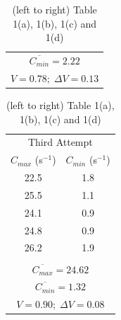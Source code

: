 \documentclass[10pt,a4paper]{article}
\begin{document}
\begin{table}[H]
\begin{tabular}{|c|c|}
\multicolumn{2}{|c|}{$\overline{C_{min}} = 2.22$}\\
\multicolumn{2}{|c|}{$V = 0.78;\; \Delta V = 0.13$}\\
\hline
\end{tabular}
\begin{tabular}{|c|c|}
\hline
\multicolumn{2}{|c|}{Third Attempt}\\
$C_{max}$ (s$^{-1}$) & $C_{min}$ (s$^{-1}$)\\
\hline
22.5 & 1.8 \\
25.5 & 1.1 \\
24.1 & 0.9 \\
24.8 & 0.9 \\
26.2 & 1.9 \\
\hline
\multicolumn{2}{|c|}{}\\[-2mm]
\multicolumn{2}{|c|}{$\overline{C_{max}} = 24.62$}\\
\multicolumn{2}{|c|}{$\overline{C_{min}} = 1.32$}\\
\multicolumn{2}{|c|}{$V = 0.90;\; \Delta V = 0.08$}\\
\hline
\end{tabular}
\caption{(left to right) Table 1(a), 1(b), 1(c) and 1(d)}
\end{table}
\end{document}
